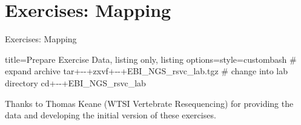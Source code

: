 \documentclass{beamer}
\begin{document}


\section{Exercises: Mapping}

\begin{frame}[fragile]{Exercises: Mapping}
\begin{tcblisting}{title={Prepare Exercise Data}, listing only, listing options={style=custombash}}
# expand archive
tar+-\quad -+zxvf+-\quad -+EBI_NGS_rsvc_lab.tgz
# change into lab directory
cd+-\quad -+EBI_NGS_rsvc_lab
\end{tcblisting}
\footnotesize{Thanks to Thomas Keane (WTSI Vertebrate Resequencing) for providing the data and developing the initial version of these exercises. }
\end{frame}
\end{document}
